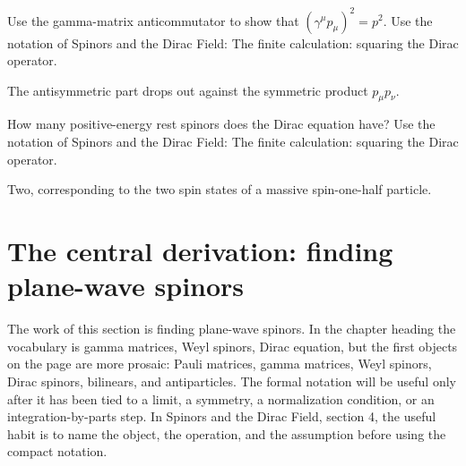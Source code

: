 \begin{exercise}
Use the gamma-matrix anticommutator to show that \((\gamma^\mu p_\mu)^2=p^2\).  Use the notation of Spinors and the Dirac Field: The finite calculation: squaring the Dirac operator.
\begin{answer}
The antisymmetric part drops out against the symmetric product \(p_\mu p_\nu\).
\end{answer}
\end{exercise}

\begin{exercise}
How many positive-energy rest spinors does the Dirac equation have?  Use the notation of Spinors and the Dirac Field: The finite calculation: squaring the Dirac operator.
\begin{answer}
Two, corresponding to the two spin states of a massive spin-one-half particle.
\end{answer}
\end{exercise}



\section{The central derivation: finding plane-wave spinors}













The work of this section is finding plane-wave spinors.  In the chapter heading the vocabulary is gamma matrices, Weyl spinors, Dirac equation, but the first objects on the page are more prosaic: Pauli matrices, gamma matrices, Weyl spinors, Dirac spinors, bilinears, and antiparticles.  The formal notation will be useful only after it has been tied to a limit, a symmetry, a normalization condition, or an integration-by-parts step.  In Spinors and the Dirac Field, section 4, the useful habit is to name the object, the operation, and the assumption before using the compact notation.

